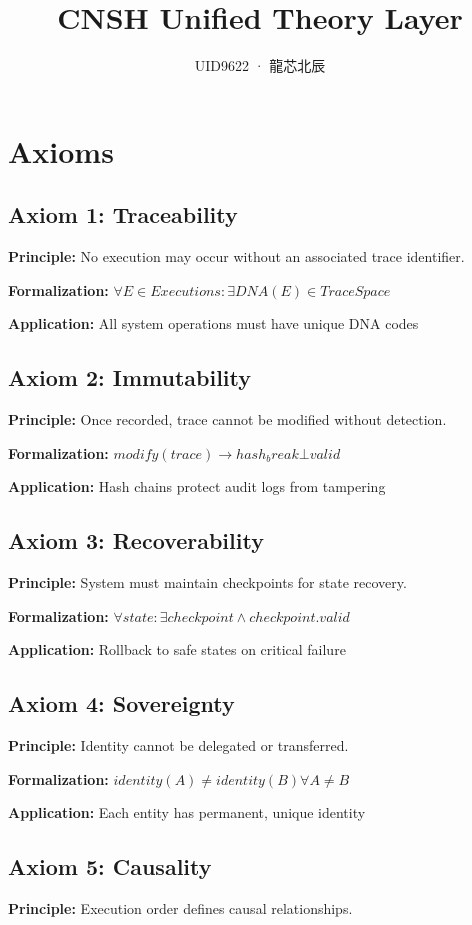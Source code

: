 \documentclass[11pt]{article}
\title{CNSH Unified Theory Layer}
\author{UID9622 · 龍芯北辰}
\begin{document}
\section{Axioms}

\subsection{Axiom 1: Traceability}
\textbf{Principle:} No execution may occur without an associated trace identifier.

\textbf{Formalization:} $∀E ∈ Executions: ∃DNA(E) ∈ TraceSpace$

\textbf{Application:} All system operations must have unique DNA codes

\subsection{Axiom 2: Immutability}
\textbf{Principle:} Once recorded, trace cannot be modified without detection.

\textbf{Formalization:} $modify(trace) → hash_break ⊥ valid$

\textbf{Application:} Hash chains protect audit logs from tampering

\subsection{Axiom 3: Recoverability}
\textbf{Principle:} System must maintain checkpoints for state recovery.

\textbf{Formalization:} $∀state: ∃checkpoint ∧ checkpoint.valid$

\textbf{Application:} Rollback to safe states on critical failure

\subsection{Axiom 4: Sovereignty}
\textbf{Principle:} Identity cannot be delegated or transferred.

\textbf{Formalization:} $identity(A) ≠ identity(B) ∀A≠B$

\textbf{Application:} Each entity has permanent, unique identity

\subsection{Axiom 5: Causality}
\textbf{Principle:} Execution order defines causal relationships.
\end{document}
